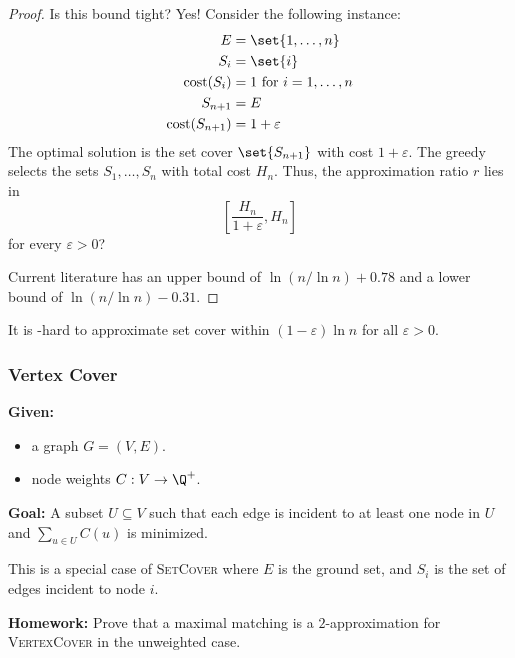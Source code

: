 \begin{proof}
    Is this bound tight?
    Yes!
    Consider the following instance: \begin{align*}
        E &= \set{1, \dots, n} \\
        S_i &= \set{i} \\
        \mathrm{cost}(S_i) &= 1 \text{ for } i = 1, \dots, n \\
        S_{n + 1} &= E \\
        \mathrm{cost}(S_{n + 1}) &= 1 + \varepsilon
    \end{align*}
    The optimal solution is the set cover $\set{S_{n+1}}$ with cost
    $1 + \varepsilon$.
    The greedy selects the sets $S_1, \dots, S_n$ with total cost $H_n$.
    Thus, the approximation ratio $r$ lies in \[
        \left[\frac{H_n}{1 + \varepsilon}, H_n\right]
    \] for every $\varepsilon > 0$?

    Current literature has an upper bound of $\ln(n / \ln n) + 0.78$ and
    a lower bound of $\ln(n / \ln n) - 0.31$.
\end{proof}

\begin{theorem} \label{thm:set_cover:np-hard}
    It is \NP-hard to approximate set cover within $(1 - \varepsilon) \ln n$
    for all $\varepsilon > 0$.
\end{theorem}

\subsubsection{Vertex Cover} \label{sec:set_cover:vertex_cover}
\vspace{1em}
\begin{problem}
    \textbf{Given:}
    \begin{itemize}
        \item a graph $G = (V, E)$.
        \item node weights $C : V \to \Q^+$.
    \end{itemize}
    \textbf{Goal:} A subset $U \subseteq V$ such that each edge is incident
    to at least one node in $U$ and $\sum_{u \in U} C(u)$ is minimized.
\end{problem}
This is a special case of \textsc{SetCover} where $E$ is the ground set,
and $S_i$ is the set of edges incident to node $i$.

\textbf{Homework:} Prove that a maximal matching is a $2$-approximation for
\textsc{VertexCover} in the unweighted case.

